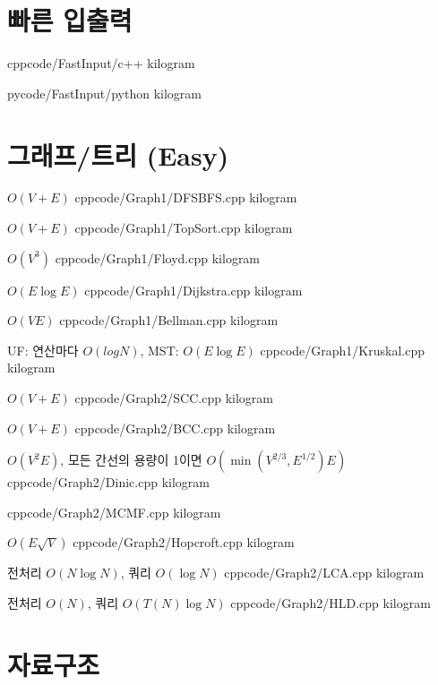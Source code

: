 \documentclass[landscape, 8pt, a4paper, twocolumn]{extarticle} %
\begin{document}
\maketitlepage

\pagebreak 

\section{빠른 입출력}

{}{}
{cpp}{code/FastInput/c++}
{kilogram}

{}{}
{py}{code/FastInput/python}
{kilogram}

\section{그래프/트리 (Easy)}

{}{$O(V+E)$}
{cpp}{code/Graph1/DFSBFS.cpp}
{kilogram}

{}{$O(V+E)$}
{cpp}{code/Graph1/TopSort.cpp}
{kilogram}

{}{$O(V^3)$}
{cpp}{code/Graph1/Floyd.cpp}
{kilogram}

{}{$O(E\log E)$}
{cpp}{code/Graph1/Dijkstra.cpp}
{kilogram}

{}{$O(VE)$}
{cpp}{code/Graph1/Bellman.cpp}
{kilogram}

{}{UF: 연산마다 $O(log N)$, MST: $O(E \log E)$}
{cpp}{code/Graph1/Kruskal.cpp}
{kilogram}

{}{$O(V+E)$}
{cpp}{code/Graph2/SCC.cpp}
{kilogram}

{}{$O(V+E)$}
{cpp}{code/Graph2/BCC.cpp}
{kilogram}

{}{$O(V^2E)$, 모든 간선의 용량이 1이면 $O(\min(V^{2/3},E^{1/2})E)$}
{cpp}{code/Graph2/Dinic.cpp}
{kilogram}

{}{}
{cpp}{code/Graph2/MCMF.cpp}
{kilogram}

{}{$O(E \sqrt V)$}
{cpp}{code/Graph2/Hopcroft.cpp}
{kilogram}

{}{전처리 $O(N \log N)$, 쿼리 $O(\log N)$}
{cpp}{code/Graph2/LCA.cpp}
{kilogram}

{}{전처리 $O(N)$, 쿼리 $O(T(N) \log N)$}
{cpp}{code/Graph2/HLD.cpp}
{kilogram}

\section{자료구조}
\end{document}

